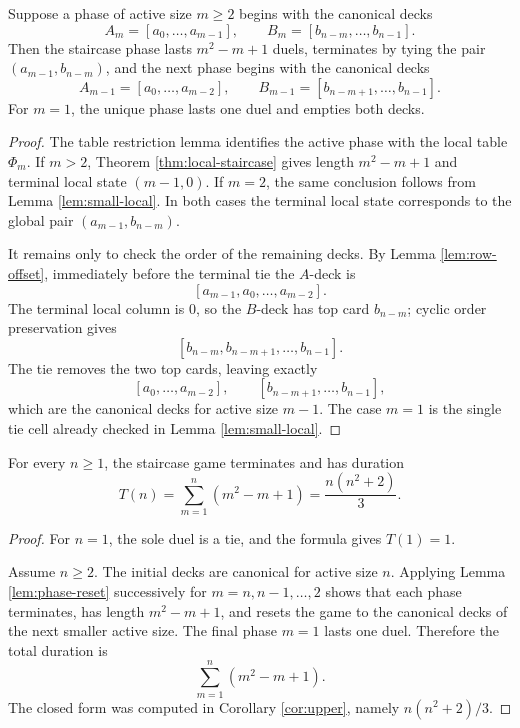 \documentclass[12pt]{article}
\begin{document}
\begin{lemma}\label{lem:phase-reset}
Suppose a phase of active size $m\ge 2$ begins with the canonical decks
\[
A_m=[a_0,\dots,a_{m-1}],\qquad B_m=[b_{n-m},\dots,b_{n-1}].
\]
Then the staircase phase lasts $m^2-m+1$ duels, terminates by tying the pair $(a_{m-1},b_{n-m})$, and the next phase begins with the canonical decks
\[
A_{m-1}=[a_0,\dots,a_{m-2}],\qquad B_{m-1}=[b_{n-m+1},\dots,b_{n-1}].
\]
For $m=1$, the unique phase lasts one duel and empties both decks.
\end{lemma}
\begin{proof}
The table restriction lemma identifies the active phase with the local table $\Phi_m$. If $m>2$, Theorem \ref{thm:local-staircase} gives length $m^2-m+1$ and terminal local state $(m-1,0)$. If $m=2$, the same conclusion follows from Lemma \ref{lem:small-local}. In both cases the terminal local state corresponds to the global pair $(a_{m-1},b_{n-m})$.

It remains only to check the order of the remaining decks. By Lemma \ref{lem:row-offset}, immediately before the terminal tie the $A$-deck is
\[
[a_{m-1},a_0,\dots,a_{m-2}].
\]
The terminal local column is $0$, so the $B$-deck has top card $b_{n-m}$; cyclic order preservation gives
\[
[b_{n-m},b_{n-m+1},\dots,b_{n-1}].
\]
The tie removes the two top cards, leaving exactly
\[
[a_0,\dots,a_{m-2}],\qquad [b_{n-m+1},\dots,b_{n-1}],
\]
which are the canonical decks for active size $m-1$. The case $m=1$ is the single tie cell already checked in Lemma \ref{lem:small-local}.
\end{proof}

\begin{theorem}[Tightness]\label{thm:tight}
For every $n\ge 1$, the staircase game terminates and has duration
\[
T(n)=\sum_{m=1}^n(m^2-m+1)=\frac{n(n^2+2)}{3}.
\]
\end{theorem}
\begin{proof}
For $n=1$, the sole duel is a tie, and the formula gives $T(1)=1$.

Assume $n\ge2$. The initial decks are canonical for active size $n$. Applying Lemma \ref{lem:phase-reset} successively for $m=n,n-1,\dots,2$ shows that each phase terminates, has length $m^2-m+1$, and resets the game to the canonical decks of the next smaller active size. The final phase $m=1$ lasts one duel. Therefore the total duration is
\[
\sum_{m=1}^n(m^2-m+1).
\]
The closed form was computed in Corollary \ref{cor:upper}, namely $n(n^2+2)/3$.
\end{proof}
\end{document}
